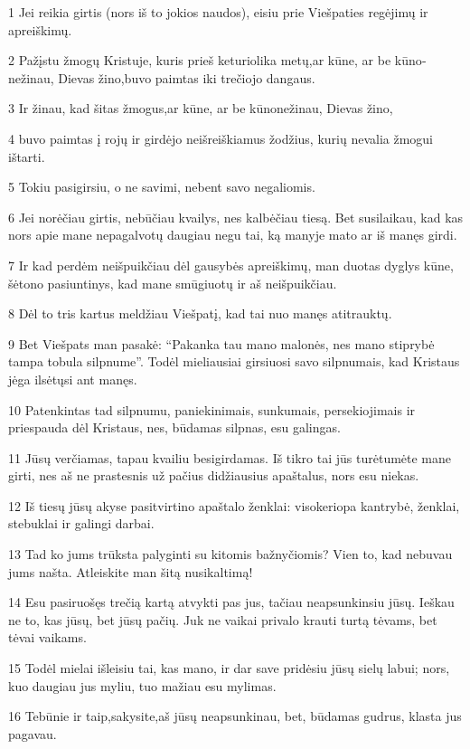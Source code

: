 \par 1 Jei reikia girtis (nors iš to jokios naudos), eisiu prie Viešpaties regėjimų ir apreiškimų. 
\par 2 Pažįstu žmogų Kristuje, kuris prieš keturiolika metų,­ar kūne, ar be kūno­nežinau, Dievas žino,­buvo paimtas iki trečiojo dangaus. 
\par 3 Ir žinau, kad šitas žmogus,­ar kūne, ar be kūno­nežinau, Dievas žino,­ 
\par 4 buvo paimtas į rojų ir girdėjo neišreiškiamus žodžius, kurių nevalia žmogui ištarti. 
\par 5 Tokiu pasigirsiu, o ne savimi, nebent savo negaliomis. 
\par 6 Jei norėčiau girtis, nebūčiau kvailys, nes kalbėčiau tiesą. Bet susilaikau, kad kas nors apie mane nepagalvotų daugiau negu tai, ką manyje mato ar iš manęs girdi. 
\par 7 Ir kad perdėm neišpuikčiau dėl gausybės apreiškimų, man duotas dyglys kūne, šėtono pasiuntinys, kad mane smūgiuotų ir aš neišpuikčiau. 
\par 8 Dėl to tris kartus meldžiau Viešpatį, kad tai nuo manęs atitrauktų. 
\par 9 Bet Viešpats man pasakė: “Pakanka tau mano malonės, nes mano stiprybė tampa tobula silpnume”. Todėl mieliausiai girsiuosi savo silpnumais, kad Kristaus jėga ilsėtųsi ant manęs. 
\par 10 Patenkintas tad silpnumu, paniekinimais, sunkumais, persekiojimais ir priespauda dėl Kristaus, nes, būdamas silpnas, esu galingas. 
\par 11 Jūsų verčiamas, tapau kvailiu besigirdamas. Iš tikro tai jūs turėtumėte mane girti, nes aš ne prastesnis už pačius didžiausius apaštalus, nors esu niekas. 
\par 12 Iš tiesų jūsų akyse pasitvirtino apaštalo ženklai: visokeriopa kantrybė, ženklai, stebuklai ir galingi darbai. 
\par 13 Tad ko jums trūksta palyginti su kitomis bažnyčiomis? Vien to, kad nebuvau jums našta. Atleiskite man šitą nusikaltimą! 
\par 14 Esu pasiruošęs trečią kartą atvykti pas jus, tačiau neapsunkinsiu jūsų. Ieškau ne to, kas jūsų, bet jūsų pačių. Juk ne vaikai privalo krauti turtą tėvams, bet tėvai vaikams. 
\par 15 Todėl mielai išleisiu tai, kas mano, ir dar save pridėsiu jūsų sielų labui; nors, kuo daugiau jus myliu, tuo mažiau esu mylimas. 
\par 16 Tebūnie ir taip,­sakysite,­aš jūsų neapsunkinau, bet, būdamas gudrus, klasta jus pagavau. 
